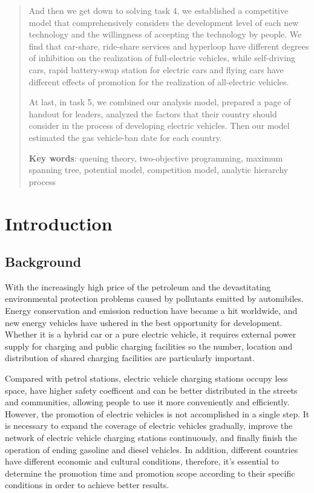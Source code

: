 \documentclass[12pt]{article}  %
\begin{document}
\begin{abstract}
And then we get down to solving task 4, we established a competitive model that comprehensively considers the development level of each new technology and the willingness of accepting the technology by people. We find that car-share, ride-share services and hyperloop have different degrees of inhibition on the realization of full-electric vehicles, while self-driving cars, rapid battery-swap station for electric cars and flying cars have different effects of promotion for the realization of all-electric vehicles. 

At last, in task 5, we combined our analysis model, prepared a page of handout for leaders, analyzed the factors that their country should consider in the process of developing electric vehicles. Then our model estimated the gas vehicle-ban date for each country.

     \vspace{5pt}
     \textbf{Key words}: queuing theory, two-objective programming, maximum
     spanning tree, potential model, competition model, analytic hierarchy process

\end{abstract}

\maketitle  %
\tableofcontents  %


\section{Introduction}
\subsection{Background}
With the increasingly high price of the petroleum and the devastitating environmental protection problems caused by pollutants emitted by automibiles. Energy conservation and emission reduction have became a hit worldwide, and new energy vehicles have ushered in the best opportunity for development. Whether it is a hybrid car or a pure electric vehicle, it requires external power supply for charging and public charging facilities so the number, location and distribution of shared charging facilities are particularly important. 

Compared with petrol stations, electric vehicle charging stations occupy less space, have higher safety coefficent and can be better distributed in the streets and communities, allowing people to use it more conveniently and efficiently. However, the promotion of electric vehicles is not accomplished in a single step. It is necessary to expand the coverage of electric vehicles gradually, improve the network of electric vehicle charging stations continuously, and finally finish the operation of ending gasoline and diesel vehicles. In addition, different countries have different economic and cultural conditions, therefore, it's essential to determine the promotion time and promotion scope according to their specific conditions in order to achieve better results.
\end{document}
